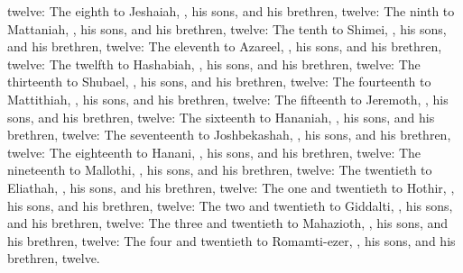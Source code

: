 {{}
twelve:
The
eighth to
Jeshaiah,
{}, his
sons, and his
brethren,
{}
twelve:
The
ninth to
Mattaniah,
{}, his
sons, and his
brethren,
{}
twelve:
The
tenth to
Shimei,
{}, his
sons, and his
brethren,
{}
twelve:
The
eleventh to
Azareel,
{}, his
sons, and his
brethren,
{}
twelve:
The
twelfth to
Hashabiah,
{}, his
sons, and his
brethren,
{}
twelve:
The
thirteenth to
Shubael,
{}, his
sons, and his
brethren,
{}
twelve:
The
fourteenth to
Mattithiah,
{}, his
sons, and his
brethren,
{}
twelve:
The
fifteenth to
Jeremoth,
{}, his
sons, and his
brethren,
{}
twelve:
The
sixteenth to
Hananiah,
{}, his
sons, and his
brethren,
{}
twelve:
The
seventeenth to
Joshbekashah,
{}, his
sons, and his
brethren,
{}
twelve:
The
eighteenth to
Hanani,
{}, his
sons, and his
brethren,
{}
twelve:
The
nineteenth to
Mallothi,
{}, his
sons, and his
brethren,
{}
twelve:
The
twentieth to
Eliathah,
{}, his
sons, and his
brethren,
{}
twelve:
The
one and
twentieth to
Hothir,
{}, his
sons, and his
brethren,
{}
twelve:
The
two and
twentieth to
Giddalti,
{}, his
sons, and his
brethren,
{}
twelve:
The
three and
twentieth to
Mahazioth,
{}, his
sons, and his
brethren,
{}
twelve:
The
four and
twentieth to
Romamti-ezer,
{}, his
sons, and his
brethren,
{}
twelve.

}
